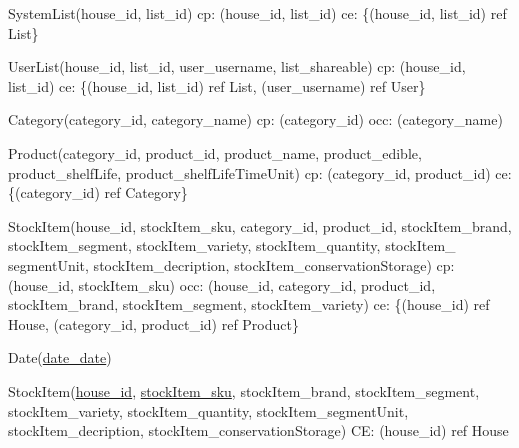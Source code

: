{\begin{description}
		\item SystemList(house\_id, list\_id)
		\newline
		\acrshort{cp}: (house\_id, list\_id) \newline
		\acrshort{ce}: \{(house\_id, list\_id) ref List\}
		
		\item UserList(house\_id, list\_id, user\_username, list\_shareable)
		\newline
		\acrshort{cp}: (house\_id, list\_id) \newline
		\acrshort{ce}: \{(house\_id, list\_id) ref List, (user\_username) ref User\}
		
		\item Category(category\_id, category\_name)
		\newline
		\acrshort{cp}: (category\_id) \newline
		\acrshort{occ}: (category\_name)
		
		\item Product(category\_id, product\_id, product\_name, product\_edible, product\_shelfLife, \newline product\_shelfLifeTimeUnit) \newline
		\acrshort{cp}: (category\_id, product\_id) \newline
		\acrshort{ce}: \{(category\_id) ref Category\}
		
		\item StockItem(house\_id, stockItem\_sku, category\_id, product\_id, stockItem\_brand, stockItem\_segment, stockItem\_variety, stockItem\_quantity, stockItem\_ segmentUnit, stockItem\_decription, stockItem\_conservationStorage) \newline
		\acrshort{cp}: (house\_id, stockItem\_sku) \newline
		\acrshort{occ}: (house\_id, category\_id, product\_id, stockItem\_brand, stockItem\_segment, stockItem\_variety) \newline
		\acrshort{ce}: \{(house\_id) ref House, (category\_id, product\_id) ref Product\}
		
		
		
	
	
	
	
		
		\item Date(\underline{date\_date})
	
		\item StockItem(\underline{house\_id}, \underline{stockItem\_sku}, stockItem\_brand, stockItem\_segment, stockItem\_variety, stockItem\_quantity, stockItem\_segmentUnit, stockItem\_decription, stockItem\_conservationStorage)  \newline
		CE: {(house\_id) ref House}
		

\end{description}}
